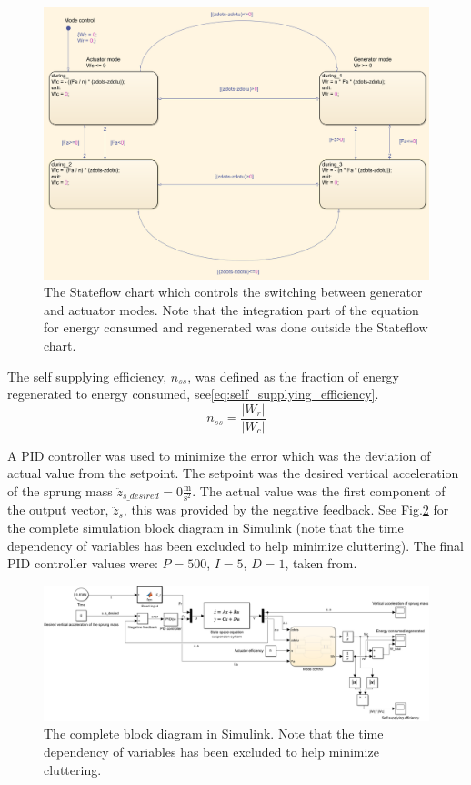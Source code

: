 \begin{figure}
    \centering
    \includegraphics[width = \columnwidth]{images/stateflow_chart.png}
    \caption{The Stateflow chart which controls the switching between generator and actuator modes. Note that the integration part of the equation for energy consumed and regenerated was done outside the Stateflow chart.}
    \label{fig:stateflow_chart}
\end{figure}
The self supplying efficiency, $n_{ss}$, was defined as the fraction of energy regenerated to energy consumed, see\:\eqref{eq:self_supplying_efficiency}.
\begin{dmath}
    \label{eq:self_supplying_efficiency}
    n_{ss} = \frac{|W_r|}{|W_c|}
\end{dmath}

A PID controller was used to minimize the error which was the deviation of actual value from the setpoint. The setpoint was the desired vertical acceleration of the sprung mass $\ddot{z}_{s\_desired} = 0\frac{\text{m}}{\text{s}^2}$. The actual value was the first component of the output vector, $\ddot{z}_s$, this was provided by the negative feedback. See Fig.\:\ref{fig:simulink_diagram} for the complete simulation block diagram in Simulink (note that the time dependency of variables has been excluded to help minimize cluttering). The final PID controller values were: $P = 500$, $I = 5$, $D = 1$, taken from\:\cite{liuModelingSimulationEnergyRegenerative2019}.
\begin{figure}
    \centering
    \includegraphics[width=\columnwidth]{images/simulink_diagram.png}
    \caption{The complete block diagram in Simulink. Note that the time dependency of variables has been excluded to help minimize cluttering.}
    \label{fig:simulink_diagram}
\end{figure}

